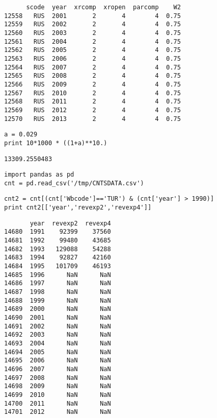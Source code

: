 \documentclass[12pt,fleqn]{article}\usepackage{common}
\begin{document}
\begin{verbatim}
      scode  year  xrcomp  xropen  parcomp    W2
12558   RUS  2001       2       4        4  0.75
12559   RUS  2002       2       4        4  0.75
12560   RUS  2003       2       4        4  0.75
12561   RUS  2004       2       4        4  0.75
12562   RUS  2005       2       4        4  0.75
12563   RUS  2006       2       4        4  0.75
12564   RUS  2007       2       4        4  0.75
12565   RUS  2008       2       4        4  0.75
12566   RUS  2009       2       4        4  0.75
12567   RUS  2010       2       4        4  0.75
12568   RUS  2011       2       4        4  0.75
12569   RUS  2012       2       4        4  0.75
12570   RUS  2013       2       4        4  0.75
\end{verbatim}

\begin{verbatim}
a = 0.029
print 10*1000 * ((1+a)**10.)
\end{verbatim}

\begin{verbatim}
13309.2550483
\end{verbatim}

\begin{verbatim}
import pandas as pd
cnt = pd.read_csv('/tmp/CNTSDATA.csv')
\end{verbatim}

\begin{verbatim}
cnt2 = cnt[(cnt['Wbcode']=='TUR') & (cnt['year'] > 1990)]
print cnt2[['year','revexp2','revexp4']]
\end{verbatim}

\begin{verbatim}
       year  revexp2  revexp4
14680  1991    92399    37560
14681  1992    99480    43685
14682  1993   129088    54288
14683  1994    92827    42160
14684  1995   101709    46193
14685  1996      NaN      NaN
14686  1997      NaN      NaN
14687  1998      NaN      NaN
14688  1999      NaN      NaN
14689  2000      NaN      NaN
14690  2001      NaN      NaN
14691  2002      NaN      NaN
14692  2003      NaN      NaN
14693  2004      NaN      NaN
14694  2005      NaN      NaN
14695  2006      NaN      NaN
14696  2007      NaN      NaN
14697  2008      NaN      NaN
14698  2009      NaN      NaN
14699  2010      NaN      NaN
14700  2011      NaN      NaN
14701  2012      NaN      NaN
\end{verbatim}
\end{document}
